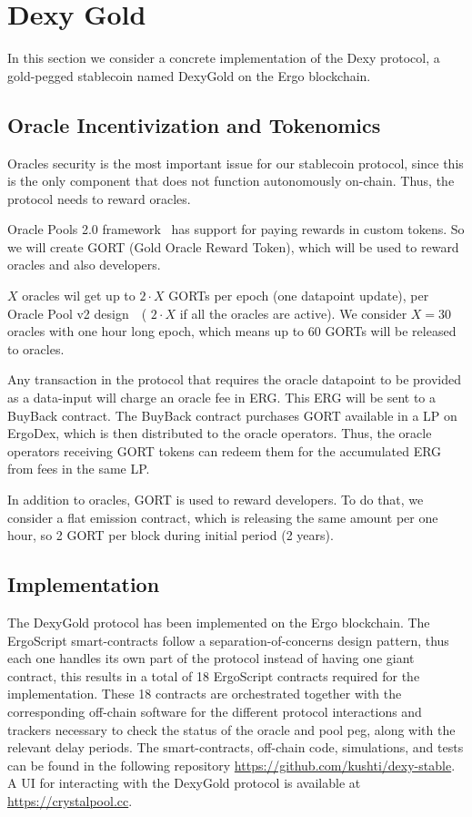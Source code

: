 \documentclass[a4paper,UKenglish,cleveref, autoref, thm-restate]{lipics-v2021}
\newcommand{\bc}{ERG}
\newcommand{\dx}{Dexy}
\newcommand{\dxg}{DexyGold}
\begin{document}
\section{Dexy Gold}
\label{sec:dexygold}

In this section we consider a concrete implementation of the \dx{} protocol, a gold-pegged stablecoin named \dxg{} on the Ergo blockchain.

\subsection{Oracle Incentivization and Tokenomics}
\label{subsec:oracle-incentivization}

Oracles security is the most important issue for our stablecoin protocol, since this is the only component that does not function autonomously on-chain. Thus, the protocol needs to reward oracles.

Oracle Pools 2.0 framework~\cite{eip23} has support for paying rewards in custom tokens. So we will create GORT (Gold
Oracle Reward Token), which will be used to reward oracles and also developers.

$X$ oracles wil get up to $2 \cdot X$ GORTs per epoch (one datapoint update), per Oracle Pool v2 design~\cite{eip23}~(
$2 \cdot X$ if all the oracles are active). We consider $X = 30$ oracles with one hour long epoch, which means up to $60$
GORTs will be released to oracles.

Any transaction in the protocol that requires the oracle datapoint to be provided as a data-input will charge an oracle fee in \bc{}. This \bc{} will be sent to a BuyBack contract. The BuyBack contract purchases GORT available in a LP on ErgoDex, which is then distributed to the oracle operators.
Thus, the oracle operators receiving GORT tokens can redeem them for the accumulated \bc{} from fees in the same LP.

In addition to oracles, GORT is used to reward developers. To do that, we consider a flat emission contract, which is
releasing the same amount per one hour, so 2 GORT per block during initial period (2 years).

\subsection{Implementation}
The \dxg{} protocol has been implemented on the Ergo blockchain. The ErgoScript smart-contracts follow a separation-of-concerns design pattern, thus each one handles its own part of the protocol instead of having one giant contract, this results in a total of 18 ErgoScript contracts required for the implementation.
These 18 contracts are orchestrated together with the corresponding off-chain software for the different protocol interactions and trackers necessary to check the status of the oracle and pool peg, along with the relevant delay periods.
The smart-contracts, off-chain code, simulations, and tests can be found in the following repository \url{https://github.com/kushti/dexy-stable}. A UI for interacting with the \dxg{} protocol is available at \url{https://crystalpool.cc}.





\end{document}
